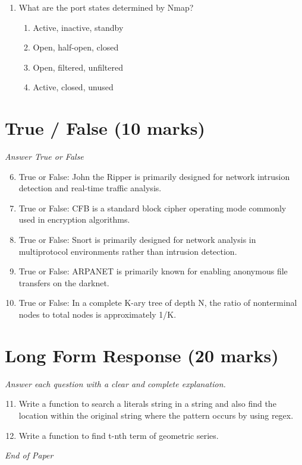 \documentclass[12pt]{article}
\begin{document}
\begin{enumerate}[label=\arabic*.]
\begin{enumerate}[label=(\alph*)]
    \item Replaced
    \item Overview
    \item Changed
    \item Violated
\end{enumerate}
\item What are the port states determined by Nmap?
\begin{enumerate}[label=(\alph*)]
    \item Active, inactive, standby
    \item Open, half-open, closed
    \item Open, filtered, unfiltered
    \item Active, closed, unused
\end{enumerate}
\end{enumerate}

\section*{True / False (10 marks)}
\textit{Answer True or False}
\begin{enumerate}[label=\arabic*.]
\setcounter{enumi}{5}
\item True or False: John the Ripper is primarily designed for network intrusion detection and real-time traffic analysis.
\item True or False: CFB is a standard block cipher operating mode commonly used in encryption algorithms.
\item True or False: Snort is primarily designed for network analysis in multiprotocol environments rather than intrusion detection.
\item True or False: ARPANET is primarily known for enabling anonymous file transfers on the darknet.
\item True or False: In a complete K-ary tree of depth N, the ratio of nonterminal nodes to total nodes is approximately 1/K.
\end{enumerate}

\section*{Long Form Response (20 marks)}
\textit{Answer each question with a clear and complete explanation.}
\begin{enumerate}[label=\arabic*.]
\setcounter{enumi}{10}
\item Write a function to search a literals string in a string and also find the location within the original string where the pattern occurs by using regex.
\item Write a function to find t-nth term of geometric series.
\end{enumerate}

\vfill
\noindent\textit{End of Paper}
\end{document}
